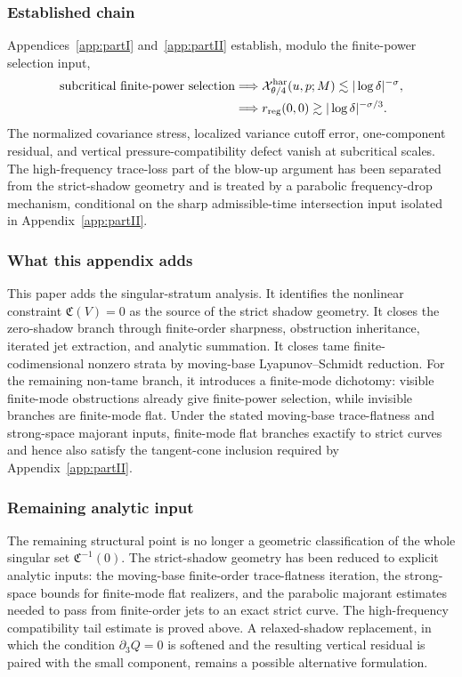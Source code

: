 \documentclass[11pt]{article}
\numberwithin{equation}{section}
\theoremstyle{plain}
\theoremstyle{definition}
\theoremstyle{remark}
\newcommand{\calC}{\mathfrak C}
\newcommand{\calX}{\mathcal X}
\begin{document}
\subsubsection{Established chain}
Appendices~\ref{app:partI} and~\ref{app:partII} establish, modulo the finite-power selection input,
\[
\begin{aligned}
        \text{subcritical finite-power selection}
        &\Longrightarrow
        \calX^{\rm har}_{\theta/4}(u,p;M)\lesssim |\log\delta|^{-\sigma},\\
        &\Longrightarrow
        r_{\rm reg}(0,0)\gtrsim |\log\delta|^{-\sigma/3}.
\end{aligned}
\]
The normalized covariance stress, localized variance cutoff error, one-component residual, and
vertical pressure-compatibility defect vanish at subcritical scales.  The high-frequency trace-loss
part of the blow-up argument has been separated from the strict-shadow geometry and is treated by a
parabolic frequency-drop mechanism, conditional on the sharp admissible-time intersection input isolated in Appendix~\ref{app:partII}.

\subsubsection{What this appendix adds}
This paper adds the singular-stratum analysis.  It identifies the nonlinear constraint \(\calC(V)=0\)
as the source of the strict shadow geometry.  It closes the zero-shadow branch through finite-order
sharpness, obstruction inheritance, iterated jet extraction, and analytic summation.  It closes tame
finite-codimensional nonzero strata by moving-base Lyapunov--Schmidt reduction.  For the remaining
non-tame branch, it introduces a finite-mode dichotomy: visible finite-mode obstructions already give
finite-power selection, while invisible branches are finite-mode flat.  Under the stated moving-base
trace-flatness and strong-space majorant inputs, finite-mode flat branches exactify to strict curves
and hence also satisfy the tangent-cone inclusion required by Appendix~\ref{app:partII}.

\subsubsection{Remaining analytic input}
The remaining structural point is no longer a geometric classification of the whole singular set
\(\calC^{-1}(0)\).  The strict-shadow geometry has been reduced to explicit analytic inputs: the
moving-base finite-order trace-flatness iteration, the strong-space bounds for finite-mode flat
realizers, and the parabolic majorant estimates needed to pass from finite-order jets to an exact
strict curve.  The high-frequency compatibility tail estimate is proved above.  A relaxed-shadow
replacement, in which the condition \(\partial_3Q=0\) is softened and the resulting vertical residual
is paired with the small component, remains a possible alternative formulation.
\end{document}
